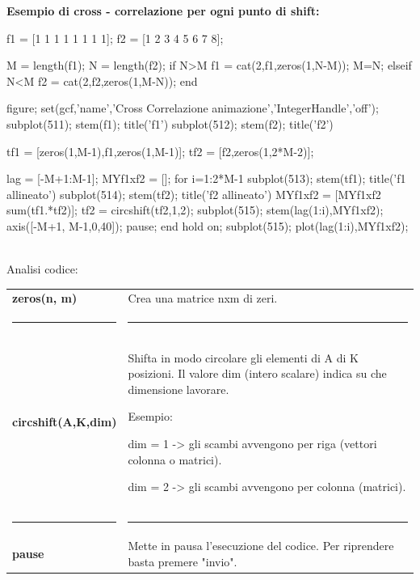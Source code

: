 \documentclass[a4paper, 10pt]{report}
\begin{document}
\noindent \textbf{Esempio di cross - correlazione per ogni punto di shift:}

\begin{code}
f1 = [1 1 1 1 1 1 1 1]; %
f2 = [1 2 3 4 5 6 7 8]; %

M = length(f1);
N = length(f2);
if N>M 
    f1 = cat(2,f1,zeros(1,N-M));
    M=N;
elseif N<M
    f2 = cat(2,f2,zeros(1,M-N));
end

figure; set(gcf,'name','Cross Correlazione animazione','IntegerHandle','off');
subplot(511); stem(f1); title('f1')
subplot(512); stem(f2); title('f2')

tf1 = [zeros(1,M-1),f1,zeros(1,M-1)];
tf2 = [f2,zeros(1,2*M-2)];

lag = [-M+1:M-1];
MYf1xf2 = [];
for i=1:2*M-1
    subplot(513); stem(tf1); title('f1 allineato')
    subplot(514); stem(tf2); title('f2 allineato')
    MYf1xf2 = [MYf1xf2 sum(tf1.*tf2)];
    tf2 = circshift(tf2,1,2);
    subplot(515); stem(lag(1:i),MYf1xf2); axis([-M+1, M-1,0,40]);
    pause;
end
hold on; subplot(515); plot(lag(1:i),MYf1xf2); 
\end{code}

\noindent \\Analisi codice:

\begin{longtable}{| p{} | p{} |}

\textbf{zeros(n, m)} & Crea una matrice nxm di zeri.
\\
\hrule & \hrule
\\
\textbf{circshift(A,K,dim)} & Shifta in modo circolare gli elementi di A di K posizioni. Il valore dim (intero scalare) indica su che dimensione lavorare.

Esempio:

dim = 1 -> gli scambi avvengono per riga (vettori colonna o matrici).

dim = 2 -> gli scambi avvengono per colonna (matrici).
\\
\hrule & \hrule
\\
\textbf{pause} & Mette in pausa l'esecuzione del codice. Per riprendere basta premere "invio".
\\
\end{longtable}
\end{document}

